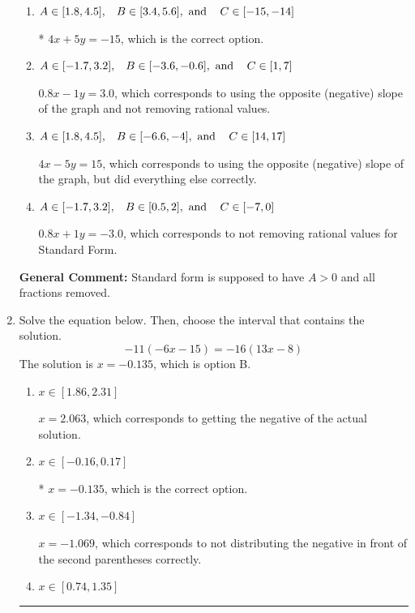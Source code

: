 \documentclass{extbook}[14pt]
\newcommand{\litem}[1]{\item #1

\rule{\textwidth}{0.4pt}}
\begin{document}
\begin{enumerate}
{\begin{enumerate}[label=\Alph*.]
 $-4x - 5y = 15$, which corresponds to not making $A$ positive (by multiplying the equation by $-1$).
\item \( A \in [1.8, 4.5], \hspace{3mm} B \in [3.4, 5.6], \text{ and } \hspace{3mm} C \in [-15, -14] \)

* $4x + 5y = -15$, which is the correct option.
\item \( A \in [-1.7, 3.2], \hspace{3mm} B \in [-3.6, -0.6], \text{ and } \hspace{3mm} C \in [1, 7] \)

 $0.8x - 1y = 3.0$, which corresponds to using the opposite (negative) slope of the graph and not removing rational values.
\item \( A \in [1.8, 4.5], \hspace{3mm} B \in [-6.6, -4], \text{ and } \hspace{3mm} C \in [14, 17] \)

 $4x - 5y = 15$, which corresponds to using the opposite (negative) slope of the graph, but did everything else correctly.
\item \( A \in [-1.7, 3.2], \hspace{3mm} B \in [0.5, 2], \text{ and } \hspace{3mm} C \in [-7, 0] \)

 $0.8x + 1y = -3.0$, which corresponds to not removing rational values for Standard Form.
\end{enumerate}

\textbf{General Comment:} Standard form is supposed to have $A > 0$ and all fractions removed.
}
\litem{
Solve the equation below. Then, choose the interval that contains the solution.
\[ -11(-6x -15) = -16(13x -8) \]The solution is \( x = -0.135 \), which is option B.\begin{enumerate}[label=\Alph*.]
\item \( x \in [1.86, 2.31] \)

$x = 2.063$, which corresponds to getting the negative of the actual solution.
\item \( x \in [-0.16, 0.17] \)

* $x = -0.135$, which is the correct option.
\item \( x \in [-1.34, -0.84] \)

$x = -1.069$, which corresponds to not distributing the negative in front of the second parentheses correctly.
\item \( x \in [0.74, 1.35] \)


\end{enumerate}}
\end{enumerate}
\end{document}
